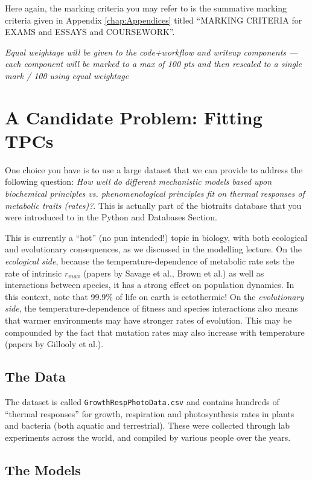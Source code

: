 Here again, the marking criteria you may refer to is the summative 
marking criteria given in Appendix \ref{chap:Appendices} titled 
``MARKING CRITERIA for EXAMS and ESSAYS and COURSEWORK''.  

{\it Equal weightage will be given to the code+workflow and writeup 
components --- each component will be marked to a max of 100 pts and then rescaled to a single mark / 100 using equal weightage}
 
\section {A Candidate Problem: Fitting TPCs}

One choice you have is to use a large dataset that we can provide to 
address the following question: {\it How well do different mechanistic models 
based upon biochemical principles vs. phenomenological principles fit on thermal responses of 
metabolic traits (rates)?}. This is actually part of the biotraits 
database that you were introduced to in the Python and Databases Section.  

This is currently a ``hot'' (no pun intended!) topic in biology, with 
both ecological and evolutionary consequences, as we discussed in the 
modelling lecture. On the {\it ecological side}, because the 
temperature-dependence of metabolic rate sets the rate of intrinsic 
$r_{max}$ (papers by Savage et al., Brown et al.) as well as 
interactions between species, it has a strong effect on population 
dynamics. In this context, note that 99.9\% of life on earth is 
ectothermic! On the {\it evolutionary side}, the temperature-dependence 
of fitness and species interactions also means that warmer environments 
may have stronger rates of evolution. This may be compounded by the 
fact that mutation rates may also increase with temperature (papers by 
Gillooly et al.).

\subsection{The Data}

The dataset is called {\tt GrowthRespPhotoData.csv} and contains 
hundreds of ``thermal responses'' for growth, respiration and 
photosynthesis rates in plants and bacteria (both aquatic and terrestrial). These were 
collected through lab experiments across the world, and compiled by 
various people over the years.

\subsection {The Models}

